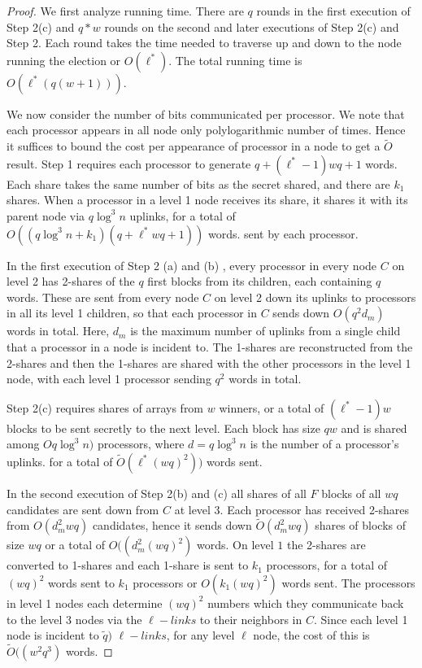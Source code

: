 \documentclass{sig-alternate}
\begin{document}
\begin{proof}
We first analyze running time. There are  $q$ rounds in the first execution of  Step 2(c)  and $q*w$ rounds on the second and later executions of
Step 2(c) and Step 2.  Each round takes the time needed to traverse up and down to the node running the election or $O(\ell^*)$. 
The total running time is $O(\ell^*(q(w+1) ))$.

We now consider the number of bits communicated per processor. We note that each processor appears in all node only polylogarithmic number of times. Hence it suffices to bound the cost per appearance of processor in a node to get  a $\tilde{O}$ result. 
Step 1 requires each processor to  generate  $q + (\ell^*-1)wq +1$ words. Each share takes the same number of bits as the secret shared,  and there are
$k_1$ shares. When a processor in a level 1 node receives its share,  it  shares it with its parent node via $q \log^3 n$ uplinks, for a total of ${O}((q  \log^3 n + k_1)(q + \ell^*wq + 1))$ words.  sent by each processor. 

In the first execution of Step 2 (a) and (b) , every processor in every node $C$ on level 2 has  2-shares of the $q$ first blocks from its children, each containing $q$ words. These are  sent from every node $C$ on level 2 down its uplinks
to processors in all its  level 1 children,  so that each processor in  $C$ sends down $ {O}(q^2 d_m)$ words in total. Here, $d_m $ is the maximum number of uplinks from a single child that a processor in a node is incident to. The 1-shares are reconstructed from the 2-shares and then the 1-shares are shared with the other processors in the level 1 node, with each level 1 processor sending $q^2$ words in total. 

 Step 2(c) requires  shares of arrays from $w$ winners, or a total of $(\ell^*-1)w$ blocks to be sent secretly to the next level.  Each block has size $qw$ and is shared among ${O}q \log^3 n)$ processors, where $d=q \log^3 n$ is the number of a processor's uplinks. 
 for a total of $\tilde{O}(\ell^* (wq)^2 ))$ words sent. 
 
In the second execution of Step 2(b) and (c) all shares of all $F$ blocks of all $wq$ candidates are sent down from $C$ at level 3.  Each processor has received 
2-shares from  ${O}(d^2_m wq)$ candidates, hence it sends down $\tilde{O}(d^2_m wq)$ shares of blocks of size $wq$ or  a total of ${O}((d^2_m (wq)^2)$
words.
On level $1$ the 2-shares are converted to 1-shares and each 1-share is sent to $k_1$ processors, for a total of $(wq)^2$ words sent to $k_1$ processors or
$O(k_1 (wq)^2)$ words sent. 
The processors in level 1 nodes each determine $(wq)^2$ numbers which they communicate back to the level 3 nodes via the $\ell-links$ to their neighbors in $C$.
Since each level 1 node is incident to  $\tilde{q })$ $\ell-links$, for any level $\ell$ node, the cost of this is $\tilde{O}( (w^2 q^3)$ words.



\end{proof}
\end{document}
